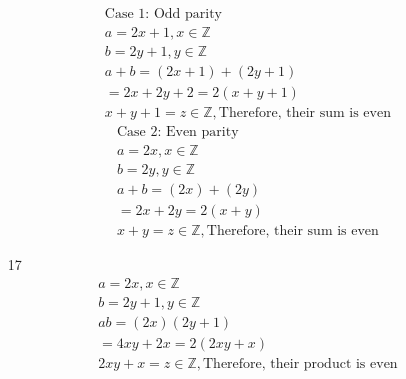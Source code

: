 \documentclass[12pt]{article}
\begin{document}
\begin{enumerate}
\begin{multicols}{2}
\begin{equation*}
\begin{split}
		\text{Case 1: Odd parity}\\
		a = 2x+1, x \in \mathbb{Z}\\
		b = 2y+1, y \in \mathbb{Z}\\
		a+b = (2x + 1) + (2y + 1)\\
		= 2x + 2y + 2 = 2(x+y+1)\\
		x+y+1 = z \in \mathbb{Z}, \text{Therefore, their sum is even}
	    \end{split}
	\end{equation*}
	\begin{equation*}
	    \begin{split}
		\text{Case 2: Even parity}\\
		a = 2x, x \in \mathbb{Z}\\
		b = 2y, y \in \mathbb{Z}\\
		a+b = (2x) + (2y)\\
		= 2x + 2y = 2(x+y)\\
		x+y = z \in \mathbb{Z}, \text{Therefore, their sum is even}
	    \end{split}
	\end{equation*}
	\end{multicols}
    \item [17] 
	\begin{equation*}
	    \begin{split}
		a = 2x, x \in \mathbb{Z}\\
		b = 2y + 1, y \in \mathbb{Z}\\
		ab = (2x)(2y + 1)\\
		= 4xy + 2x = 2(2xy + x)\\
		2xy + x = z \in \mathbb{Z}, \text{Therefore, their product is even}
	    \end{split}
	\end{equation*}
\end{enumerate}
\end{document}
